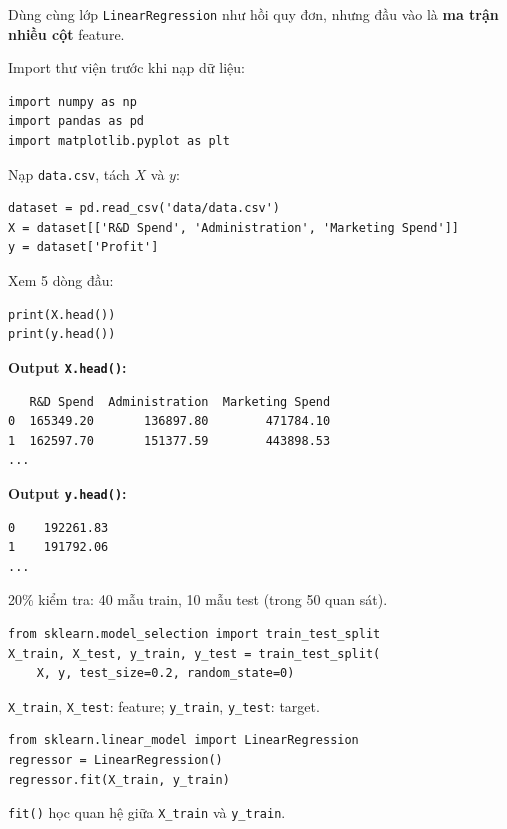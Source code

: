 \begin{phuongphap}[title={Lớp \texttt{LinearRegression}}]
Dùng cùng lớp \texttt{LinearRegression} như hồi quy đơn, nhưng đầu vào là \textbf{ma trận nhiều cột} feature.
\end{phuongphap}

\begin{vidu}[title={Bước 1: Chuẩn bị dữ liệu}]
Import thư viện trước khi nạp dữ liệu:

\begin{lstlisting}
import numpy as np
import pandas as pd
import matplotlib.pyplot as plt
\end{lstlisting}

Nạp \texttt{data.csv}, tách $X$ và $y$:

\begin{lstlisting}
dataset = pd.read_csv('data/data.csv')
X = dataset[['R&D Spend', 'Administration', 'Marketing Spend']]
y = dataset['Profit']
\end{lstlisting}

Xem 5 dòng đầu:

\begin{lstlisting}
print(X.head())
print(y.head())
\end{lstlisting}

\textbf{Output \texttt{X.head()}:}
\begin{verbatim}
   R&D Spend  Administration  Marketing Spend
0  165349.20       136897.80        471784.10
1  162597.70       151377.59        443898.53
...
\end{verbatim}

\textbf{Output \texttt{y.head()}:}
\begin{verbatim}
0    192261.83
1    191792.06
...
\end{verbatim}
\end{vidu}

\begin{vidu}[title={Chia train/test}]
20\% kiểm tra: 40 mẫu train, 10 mẫu test (trong 50 quan sát).

\begin{lstlisting}
from sklearn.model_selection import train_test_split
X_train, X_test, y_train, y_test = train_test_split(
    X, y, test_size=0.2, random_state=0)
\end{lstlisting}

\texttt{X\_train}, \texttt{X\_test}: feature; \texttt{y\_train}, \texttt{y\_test}: target.
\end{vidu}

\begin{vidu}[title={Bước 2: Huấn luyện}]
\begin{lstlisting}
from sklearn.linear_model import LinearRegression
regressor = LinearRegression()
regressor.fit(X_train, y_train)
\end{lstlisting}

\texttt{fit()} học quan hệ giữa \texttt{X\_train} và \texttt{y\_train}.
\end{vidu}


